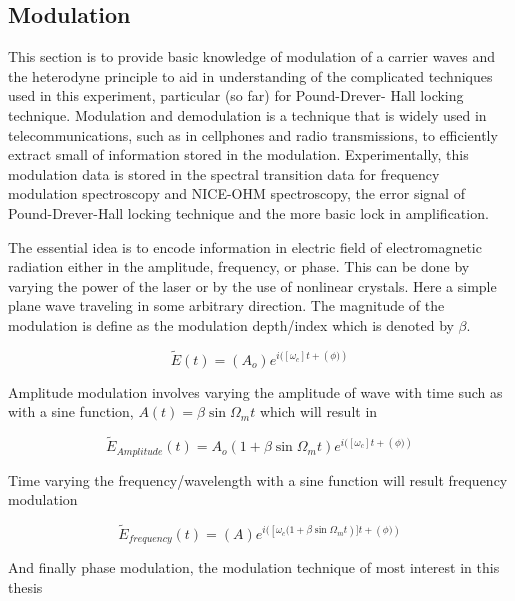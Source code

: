 \documentclass[11pt,a4paper]{book}
\begin{document}
		\subsection{Modulation}
			\label{subsec:Modulation}
			This section is to provide basic knowledge of modulation of a carrier waves and the heterodyne principle to aid in understanding of the complicated techniques used in this experiment, particular (so far) for Pound-Drever- Hall locking technique. Modulation and demodulation is a technique that is widely used in telecommunications, such as in cellphones and radio transmissions, to efficiently extract small of information stored in the modulation. Experimentally, this modulation data is stored in the spectral transition data for frequency modulation spectroscopy and NICE-OHM spectroscopy, the error signal of Pound-Drever-Hall locking technique and the more basic lock in amplification.
			
			The essential idea is to encode information in electric field of electromagnetic radiation either in the amplitude, frequency, or phase. This can be done by varying the power of the laser or by the use of nonlinear crystals. Here a simple plane wave traveling in some arbitrary direction. The magnitude of the modulation is define as the modulation depth/index which is denoted by $\beta$.
			
			\begin{equation}
				\tilde{E}(t)=\left(A_o\right)e^{i(\left[\omega_c\right] t + \left(\phi)\right)}
			\end{equation}
			
			Amplitude modulation involves varying the amplitude of wave with time such as with a sine function, $A(t)=\beta \sin{\Omega_m t}$ which will result in
			
			\begin{equation}
				\tilde{E}_{Amplitude}(t)=A_o\left(1+\beta \sin{\Omega_m t}\right) e^{i(\left[\omega_c\right] t + \left(\phi)\right)}
			\end{equation}
			
			Time varying the frequency/wavelength with a sine function will result frequency modulation
			
			\begin{equation}
				\tilde{E}_{frequency}(t)=\left(A\right) e^{i(\left[\omega_c (1+\beta \sin{\Omega_m t}\right)] t + \left(\phi)\right)}
			\end{equation}
			
			And finally phase modulation, the modulation technique of most interest in this thesis
			
\end{document}
